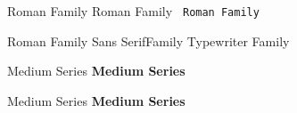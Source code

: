 \documentclass{article}
\begin{document}
    \textrm{
        Roman Family
    }
    \textsf{
        Roman Family
    }
    \texttt{
        Roman Family
    }

    {\rmfamily Roman Family} {\sffamily Sans SerifFamily} {\ttfamily Typewriter Family}


    \textmd{
        Medium Series
    }
    \textbf{
        Medium Series
    }

    {\mdseries Medium Series} {\bfseries Medium Series}
\end{document}
